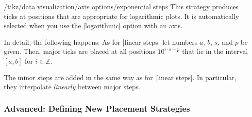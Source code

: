\label{section-dv-exponential-strategy}

\begin{key}{/tikz/data visualization/axis options/exponential steps}
    This strategy produces ticks at positions that are appropriate for logarithmic plots. It is automatically selected when you use the |logarithmic| option with an axis.

    In detail, the following happens: As for |linear steps| let numbers $a$, $b$, $s$, and $p$ be given. Then, major ticks are placed at all positions $10^{i\cdot s+p}$ that lie in the interval $[a,b]$ for $i \in \mathbb{Z}$.

    The minor steps are added in the same way as for |linear steps|. In particular, they interpolate \emph{linearly} between major steps.
\begin{codeexample}[preamble={\usetikzlibrary{datavisualization}}]
\end{codeexample}
\end{key}


\subsubsection{Advanced: Defining New Placement Strategies}

